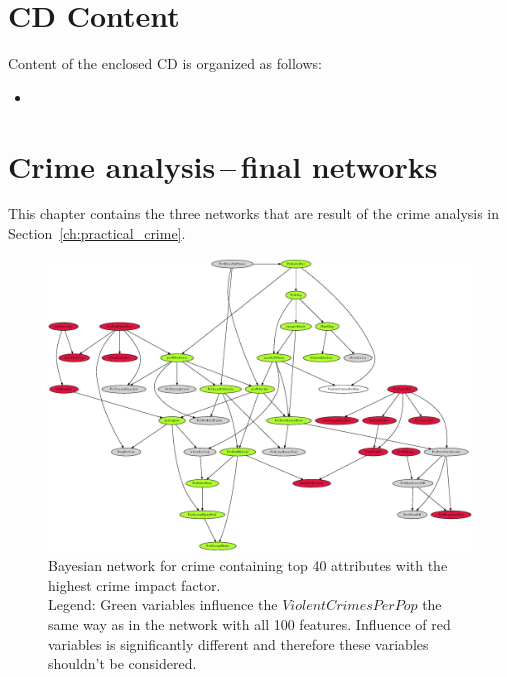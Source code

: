 





\chapter{CD Content}
Content of the enclosed CD is organized as follows:
\begin{itemize}
    \item {}
\end{itemize} 





\chapter{Crime analysis\,--\,final networks}\label{ch:appendix_crime_net}
This chapter contains the three networks that are result of the crime analysis in Section~\ref{ch:practical_crime}.


\begin{hugepage}
\pdfpagewidth
\begin{figure}[h]
    \centering
    \vspace*{-2.5cm}
    \includegraphics[scale=0.834]{fig/top-40_intersection_tolerance-1}
    \caption{Bayesian network for crime containing top 40 attributes with the highest crime impact factor.
    \\Legend: Green variables influence the $ViolentCrimesPerPop$ the same way as in the network with all 100 features. Influence of red variables is significantly different and therefore these variables shouldn't be considered.}
    \label{fig:crime_net_top40}
\end{figure}
\end{hugepage}

